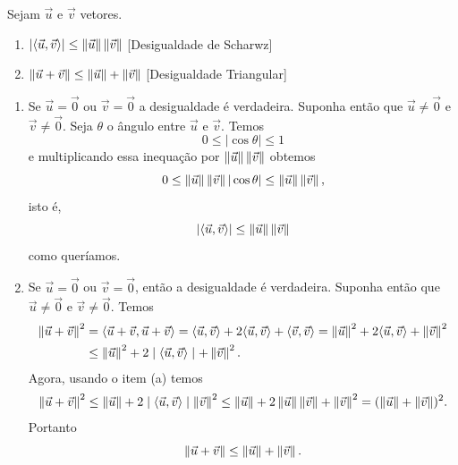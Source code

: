 \begin{proposicao}\label{DesigualdadeTriangular}
    Sejam $\vec{u}$ e $\vec{v}$ vetores.
    \begin{enumerate}
        \item $|\langle \vec{u}, \vec{v} \rangle| \le \left\Vert{\vec{u}}\right\Vert\left\Vert{\vec{v}}\right\Vert$ [Desigualdade de Scharwz]
        \item $\left\Vert{\vec{u} + \vec{v}}\right\Vert \le \left\Vert{\vec{u}}\right\Vert + \left\Vert{\vec{v}}\right\Vert$ [Desigualdade Triangular]
    \end{enumerate}
\end{proposicao}
\begin{prova}
    \begin{enumerate}
        \item Se $\vec{u} = \vec{0}$ ou $\vec{v} = \vec{0}$ a desigualdade é verdadeira. Suponha então que $\vec{u} \ne \vec{0}$ e $\vec{v} \ne \vec{0}$. Seja $\theta$ o ângulo entre $\vec{u}$ e $\vec{v}$. Temos
              \[
                  0 \le |\cos\theta| \le 1
              \]
              e multiplicando essa inequação por $\left\Vert{\vec{u}}\right\Vert\left\Vert{\vec{v}}\right\Vert$ obtemos
              \[
                  0 \le \left\Vert{\vec{u}}\right\Vert\left\Vert{\vec{v}}\right\Vert|\cos\theta| \le \left\Vert{\vec{u}}\right\Vert\left\Vert{\vec{v}}\right\Vert,
              \]
              isto é,
              \[
                  |\langle \vec{u}, \vec{v} \rangle| \le \left\Vert{\vec{u}}\right\Vert\left\Vert{\vec{v}}\right\Vert
              \]
              como queríamos.
        \item Se $\vec{u} = \vec{0}$ ou $\vec{v} = \vec{0}$, então a desigualdade é verdadeira. Suponha então que $\vec{u} \ne \vec{0}$ e $\vec{v} \ne \vec{0}$. Temos
              \begin{align*}
                  \left\Vert{\vec{u} + \vec{v}}\right\Vert^2 & = \langle\vec{u} + \vec{v}, \vec{u} + \vec{v}\rangle = \langle \vec{u}, \vec{v} \rangle + 2\langle \vec{u}, \vec{v} \rangle + \langle \vec{v}, \vec{v} \rangle = \left\Vert{\vec{u}}\right\Vert^2 + 2\langle \vec{u}, \vec{v} \rangle + \left\Vert{\vec{v}}\right\Vert^2 \\ &\le \left\Vert{\vec{u}}\right\Vert^2 + 2\mid\langle \vec{u}, \vec{v} \rangle\mid + \left\Vert{\vec{v}}\right\Vert^2.
              \end{align*}
              Agora, usando o item (a) temos
              \begin{align*}
                  \left\Vert{\vec{u} + \vec{v}}\right\Vert^2 \le \left\Vert{\vec{u}}\right\Vert + 2\mid\langle \vec{u}, \vec{v} \rangle\mid \left\Vert{\vec{v}}\right\Vert^2 \le \left\Vert{\vec{u}}\right\Vert + 2\left\Vert{\vec{u}}\right\Vert\left\Vert{\vec{v}}\right\Vert + \left\Vert{\vec{v}}\right\Vert^2 = (\left\Vert{\vec{u}}\right\Vert + \left\Vert{\vec{v}}\right\Vert)^2.
              \end{align*}
              Portanto
              \[
                  \left\Vert{\vec{u} + \vec{v}}\right\Vert \le \left\Vert{\vec{u}}\right\Vert + \left\Vert{\vec{v}}\right\Vert.
              \]
    \end{enumerate}
\end{prova}

